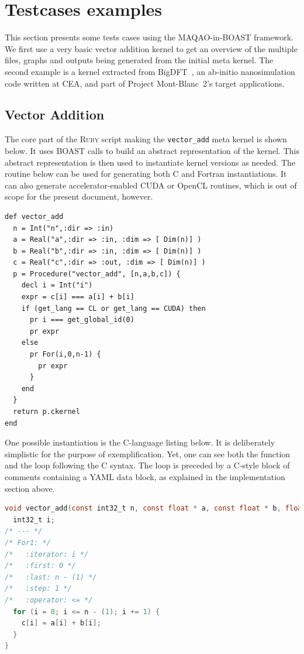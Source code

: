 \documentclass[11pt, a4paper, twoside]{montblanc2}
\def\ruby{\textsc{Ruby}\xspace}
\begin{document}
\section{Testcases examples}\label{sec:examples}

This section presents some tests cases using the MAQAO-in-BOAST framework. We 
first use a very basic vector addition kernel to get an overview of the multiple 
files, graphs and outputs being generated from the initial meta kernel. The 
second example is a kernel extracted from 
BigDFT~\cite{genovese:bigdft:jcp:2008}, an ab-initio nanosimulation code written 
at CEA, and part of Project Mont-Blanc~2's target applications.

  \subsection{Vector Addition}

  The core part of the \ruby script making the \verb|vector_add| meta kernel is 
  shown below. It uses BOAST calls to build an abstract representation of the 
  kernel. This abstract representation is then used to instantiate kernel 
  versions as needed. The routine below can be used for generating both C and 
  Fortran instantiations. It can also generate accelerator-enabled CUDA or 
  OpenCL routines, which is out of scope for the present document, however.
  
\begin{lstlisting}[style=BOAST]
def vector_add
  n = Int("n",:dir => :in)
  a = Real("a",:dir => :in, :dim => [ Dim(n)] )
  b = Real("b",:dir => :in, :dim => [ Dim(n)] )
  c = Real("c",:dir => :out, :dim => [ Dim(n)] )
  p = Procedure("vector_add", [n,a,b,c]) {
    decl i = Int("i")
    expr = c[i] === a[i] + b[i]
    if (get_lang == CL or get_lang == CUDA) then
      pr i === get_global_id(0)
      pr expr
    else
      pr For(i,0,n-1) {
        pr expr
      }
    end
  }
  return p.ckernel
end
\end{lstlisting}

One possible instantiation is the C-language listing below. It is deliberately 
simplistic for the purpose of exemplification. Yet, one can see both the 
function and the loop following the C syntax. The loop is preceded by a C-style 
block of comments containing a YAML data block, as explained in the 
implementation section above. 

\begin{lstlisting}[language=C]
void vector_add(const int32_t n, const float * a, const float * b, float * c){
  int32_t i;
/* --- */
/* For1: */
/*   :iterator: i */
/*   :first: 0 */
/*   :last: n - (1) */
/*   :step: 1 */
/*   :operator: <= */
  for (i = 0; i <= n - (1); i += 1) {
    c[i] = a[i] + b[i];
  }
}
\end{lstlisting}
\end{document}
